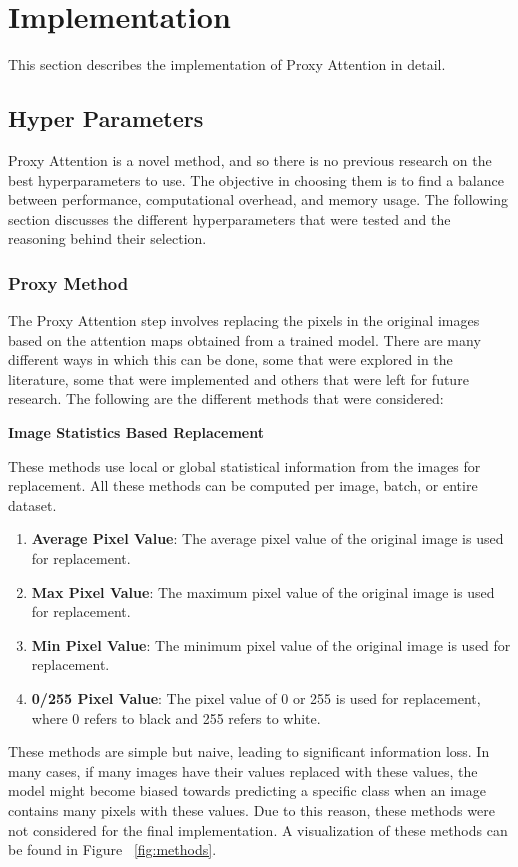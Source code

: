 \documentclass[a4paper,11pt,openright]{book}
\begin{document}
\section{Implementation}
This section describes the implementation of Proxy Attention in detail. 
\subsection{Hyper Parameters} \label{sec:hyperparameters}
Proxy Attention is a novel method, and so there is no previous research on the best hyperparameters to use. The objective in choosing them is to find a balance between performance, computational overhead, and memory usage. The following section discusses the different hyperparameters that were tested and the reasoning behind their selection.

\subsubsection{Proxy Method}
The Proxy Attention step involves replacing the pixels in the original images based on the attention maps obtained from a trained model. There are many different ways in which this can be done, some that were explored in the literature, some that were implemented and others that were left for future research. The following are the different methods that were considered:

\textbf{Image Statistics Based Replacement}

These methods use local or global statistical information from the images for replacement. All these methods can be computed per image, batch, or entire dataset.

\begin{enumerate}
    \item \textbf{Average Pixel Value}: The average pixel value of the original image is used for replacement.
    \item \textbf{Max Pixel Value}: The maximum pixel value of the original image is used for replacement.
    \item \textbf{Min Pixel Value}: The minimum pixel value of the original image is used for replacement.
    \item \textbf{0/255 Pixel Value}: The pixel value of 0 or 255 is used for replacement, where 0 refers to black and 255 refers to white.
\end{enumerate}
These methods are simple but naive, leading to significant information loss. In many cases, if many images have their values replaced with these values, the model might become biased towards predicting a specific class when an image contains many pixels with these values.
Due to this reason, these methods were not considered for the final implementation. A visualization of these methods can be found in Figure ~\ref{fig:methods}.
\end{document}

